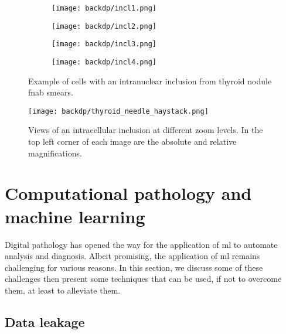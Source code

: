 \begin{figure}
  \centering
  \begin{subfigure}[t]{0.225\textwidth}
    \centering
    \texttt{[image: backdp/incl1.png]}
  \end{subfigure}
  \hspace{0.1cm}
  \begin{subfigure}[t]{0.225\textwidth}
    \centering
    \texttt{[image: backdp/incl2.png]}
  \end{subfigure}
  \hspace{0.1cm}
  \begin{subfigure}[t]{0.225\textwidth}
    \centering
    \texttt{[image: backdp/incl3.png]}
  \end{subfigure}
  \hspace{0.1cm}
  \begin{subfigure}[t]{0.225\textwidth}
    \centering
    \texttt{[image: backdp/incl4.png]}
  \end{subfigure}
  \caption{Example of cells with an intranuclear inclusion from thyroid nodule \acrshort{fnab} smears.}
  \label{fig:backdp:thyroid_inclusion}
\end{figure}

\begin{figure}
  \centering
  \texttt{[image: backdp/thyroid\_needle\_haystack.png]}
  \caption{Views of an intracellular inclusion at different zoom levels. In the top left corner of each image are the absolute and relative magnifications.}
  \label{fig:backdp:thyroid_needle_haystack}
\end{figure}


\section{Computational pathology and machine learning}
\label{sec:backdp:ml}

Digital pathology has opened the way for the application of \acrlong{ml} to automate analysis and diagnosis. Albeit promising, the application of \acrlong{ml} remains challenging for various reasons. In this section, we discuss some of these challenges then present some techniques that can be used, if not to overcome them, at least to alleviate them.


\subsection{Data leakage}
\label{ssec:backdp:dataleakage}

